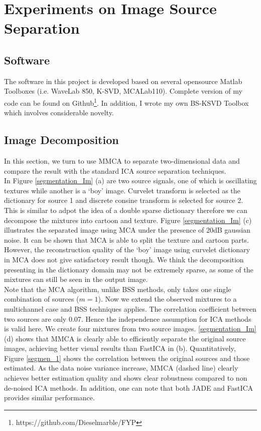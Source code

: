 \section{Experiments on Image Source Separation}
\subsection{Software}
The software in this project is developed based on several opensource Matlab Toolboxes (i.e. WaveLab 850, K-SVD, MCALab110). Complete version of my code can be found on Github\footnote{https://github.com/Dieselmarble/FYP}. In addition, I wrote my own BS-KSVD Toolbox which involves considerable novelty.

\subsection{Image Decomposition}
In this section, we turn to use MMCA to separate two-dimensional data and compare the result with the standard ICA source separation techniques. \\

In Figure \ref{segmentation_Im} (a) are two source signals, one of which is oscillating textures while another is  a `boy' image. Curvelet transform is selected as the dictionary for source 1 and discrete consine transform is selected for source 2. This is similar to adpot the idea of a double sparse dictionary therefore we can decompose the mixtures into cartoon and texture. Figure \ref{segmentation_Im} (c) illustrates the separated image using MCA under the presence of 20dB gaussian noise. It can be shown that MCA is able to split the texture and cartoon parts. However, the reconstruction quality of the `boy' image using curvelet dictionary in MCA does not give satisfactory result though. We think the decomposition presenting in the dictionary domain may not be extremely sparse, as some of the mixtures can still be seen in the output image. \\

Note that the MCA algorithm, unlike BSS methods, only takes one single combination of sources ($m = 1$). Now we extend the observed mixtures to a multichannel case and BSS techniques applies. The correlation coefficient between two sources are only 0.07. Hence the independence assumption for ICA methods is valid here. We create four mixtures from two source images.
\ref{segmentation_Im} (d) shows that MMCA is clearly able to efficiently separate the original source images, achieving better visual results than FastICA in (b). Quantitatively, Figure \ref{segmen_1} shows the correlation between the original sources and those estimated. As the data noise variance increase, 
MMCA (dashed line) clearly achieves better estimation quality and shows clear robustness compared to non de-noised ICA methods. In addition, one can note that both JADE and FastICA provides similar performance.\\

